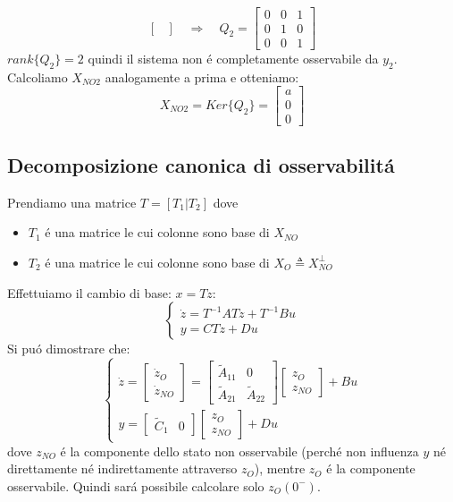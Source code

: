 \documentclass[../main.tex]{subfiles}
\begin{document}
\begin{mdframed}[style=Exercise]
\begin{Exercise}[title={Calcolare $ X_{NO} $}, difficulty=1]
\[\begin{bmatrix}
					\end{bmatrix}
					\quad\Rightarrow\quad
					Q_2 =
					\begin{bmatrix}
						0 & 0 & 1\\
						0 & 1 & 0\\
						0 & 0 & 1
					\end{bmatrix}
				\] 
				$ rank\{Q_2\} = 2 $ quindi il sistema non \'e completamente osservabile da $ y_2 $. Calcoliamo $ X_{NO2} $ analogamente a prima e otteniamo:
				\[
					X_{NO2} = Ker\{Q_2\} =
					\begin{bmatrix}
						a\\
						0\\
						0
					\end{bmatrix}
				\]
			\end{Exercise}
		\end{mdframed}

	\subsection{Decomposizione canonica di osservabilit\'a}
		Prendiamo una matrice $ T = [T_1 | T_2] $ dove
		\begin{itemize}
			\item 
				$ T_1 $ \'e una matrice le cui colonne sono base di $ X_{NO} $
			\item
				$ T_2 $ \'e una matrice le cui colonne sono base di $ X_O \triangleq X_{NO}^{\perp} $
		\end{itemize}
		Effettuiamo il cambio di base: $ x = Tz $:
		\[
			\begin{cases}
				\dot z = T^{-1}ATz + T^{-1}Bu\\
				y = CTz + Du
			\end{cases}
		\]
		Si pu\'o dimostrare che:
		\[
			\begin{cases}
				\dot z =
				\begin{bmatrix}
					\dot z_O\\
					\dot z_{NO}
				\end{bmatrix} =
				\begin{bmatrix}
					\tilde A_{11} & 0\\
					\tilde A_{21} & \tilde A_{22}
				\end{bmatrix}
				\begin{bmatrix}
					z_O\\
					z_{NO}
				\end{bmatrix}
				+ Bu
				\\[.5cm]
				y =
				\begin{bmatrix}
					\tilde C_1 & 0
				\end{bmatrix}
				\begin{bmatrix}
					z_{O}\\
					z_{NO}
				\end{bmatrix}
				+ Du
			\end{cases}
		\]
		dove $ z_{NO} $ \'e la componente dello stato non osservabile (perch\'e non influenza $ y $ n\'e direttamente n\'e indirettamente attraverso $ z_O $), mentre $ z_O $ \'e la componente osservabile. Quindi sar\'a possibile calcolare solo $ z_O(0^{-}) $.
		
\end{document}
